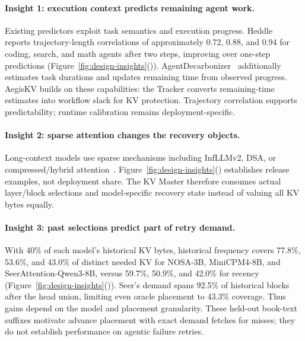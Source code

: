 \paragraph{Insight 1: execution context predicts remaining agent work.}
Existing predictors exploit task semantics and execution progress.
Heddle~\cite{zhang2026heddle} reports trajectory-length correlations of
approximately 0.72, 0.88, and 0.94 for coding, search, and math agents
after two steps, improving over one-step predictions
(Figure~\ref{fig:design-insights}()).
AgentDecarbonizer~\cite{yan2026agentdecarbonizer} additionally estimates
task durations and updates remaining time from observed progress.
AegisKV builds on these capabilities: the Tracker converts remaining-time
estimates into workflow slack for KV protection. Trajectory correlation
supports predictability; runtime calibration remains deployment-specific.

\paragraph{Insight 2: sparse attention changes the recovery objects.}
Long-context models use sparse mechanisms including InfLLMv2,
DSA, or compressed/hybrid attention~\cite{minicpm4model,
openbmb2025minicpm41,deepseek2025v32exp,deepseek2025v32model,
zai2026glm5model,openbmb2026sala,deepseek2026v4model,minimax2026m3,
zai2026glm52,longcat2026sparse}.
Figure~\ref{fig:design-insights}()
establishes release examples, not deployment share.
The KV Master therefore consumes actual layer/block selections and
model-specific recovery state instead of valuing all KV bytes equally.

\paragraph{Insight 3: past selections predict part of retry demand.}
With 40\% of each model's historical KV bytes, historical frequency
covers 77.8\%, 53.6\%, and 43.0\% of distinct needed KV for NOSA-3B,
MiniCPM4-8B, and SeerAttention-Qwen3-8B, versus 59.7\%, 50.9\%, and
42.0\% for recency
(Figure~\ref{fig:design-insights}()).
Seer's demand spans 92.5\% of historical blocks after the head union,
limiting even oracle placement to 43.3\% coverage. Thus gains depend on
the model and placement granularity. These held-out book-text suffixes
motivate advance placement with exact demand fetches for misses;
they do not establish performance on agentic failure retries.
